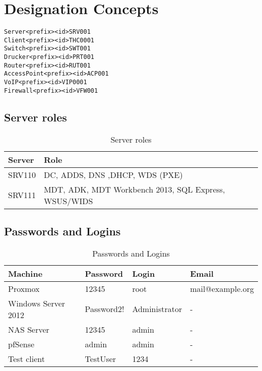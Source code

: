 \section{Designation Concepts}
\begin{lstlisting}[caption=Naming Convention,frame=single]  
Server<prefix><id>SRV001
Client<prefix><id>THC0001
Switch<prefix><id>SWT001
Drucker<prefix><id>PRT001
Router<prefix><id>RUT001
AccessPoint<prefix><id>ACP001
VoIP<prefix><id>VIP0001
Firewall<prefix><id>VFW001
\end{lstlisting}
\newpage

\subsection{Server roles}
\begin{table}[h]		
	\begin{tabular}{l|l}
		\textbf{Server} & \textbf{Role}                                        \\ \hline
		SRV110          & DC, ADDS, DNS ,DHCP, WDS (PXE)                       \\ 
		SRV111          & MDT, ADK, MDT Workbench 2013, SQL Express, WSUS/WIDS
	\end{tabular}
	\caption{Server roles}
	\label{Tbl_Server_roles}
\end{table}

\subsection{Passwords and Logins}
\begin{table}[h]
	\begin{tabular}{l|l|l|l}
		\textbf{Machine}             & \textbf{Password}   & \textbf{Login}         & \textbf{Email}            \\ \hline
		Proxmox             & 12345      & root          & mail@example.org \\
		Windows Server 2012 & Password2! & Administrator & -                \\
		NAS Server			& 12345		 & admin		& -                 \\
		pfSense             & admin      & admin        & -                 \\
		Test client         & TestUser   & 1234         & -                 \\
	\end{tabular}
	\caption{Passwords and Logins}
	\label{Tbl_Passwords_Logins}
\end{table}

